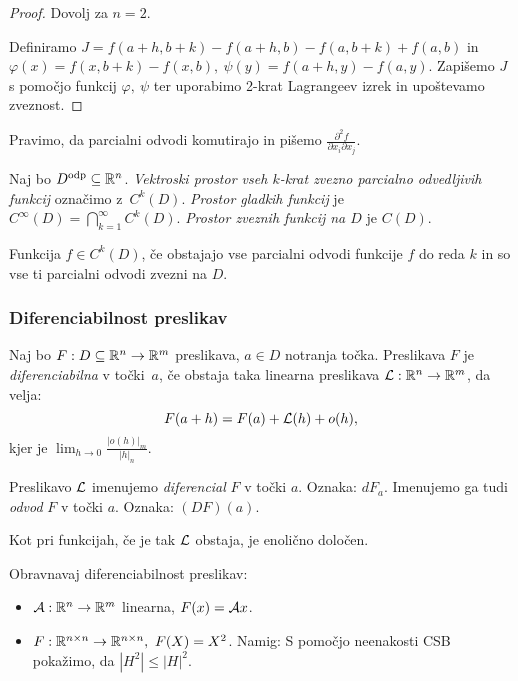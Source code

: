 \begin{proof}
    Dovolj za $n=2$. 
    
    Definiramo $J = f(a+h, b+k) - f(a+h, b) - f(a, b+k) + f(a,b)$ in $\varphi(x) = f(x, b+k) - f(x, b), \ \psi(y) = f(a+h, y) - f(a, y)$. Zapišemo $J$ s pomočjo funkcij $\varphi, \ \psi$ ter uporabimo 2-krat Lagrangeev izrek in upoštevamo zveznost.
\end{proof}

\begin{opomba}
     Pravimo, da parcialni odvodi komutirajo in pišemo $\frac{\partial^2 f}{\partial x_i \partial x_j}$.
\end{opomba}

\begin{definicija}
    Naj bo $D^\text{odp} \subseteq \mathbb{R}^n$. \emph{Vektroski prostor vseh $k$-krat zvezno parcialno odvedljivih funkcij} označimo z~$C^k(D)$. \emph{Prostor gladkih funkcij} je $C^\infty(D) = \bigcap_{k=1}^\infty C^k(D)$. \emph{Prostor zveznih funkcij na $D$} je $C(D)$.
\end{definicija}

\begin{opomba}
    Funkcija $f \in C^k(D)$, če obstajajo vse parcialni odvodi funkcije $f$ do reda $k$ in so vse ti parcialni odvodi zvezni na $D$. 
\end{opomba}

\subsubsection{Diferenciabilnost preslikav}

\begin{definicija}
    Naj bo $F: D \subseteq \mathbb{R}^n \to \mathbb{R}^m$ preslikava, $a \in D$ notranja točka. Preslikava $F$ je \emph{diferenciabilna} v točki~$a$, če obstaja taka linearna preslikava $\mathcal{L}: \mathbb{R}^n \to \mathbb{R}^m$, da velja:
    $$F(a+h) = F(a) + \mathcal{L}(h) + o(h),$$
    kjer je $\lim_{h \to 0} \frac{|o(h)|_m}{|h|_n}$. 

    Preslikavo $\mathcal{L}$ imenujemo \emph{diferencial} $F$ v točki $a$. Oznaka: $dF_a$. Imenujemo ga tudi \emph{odvod} $F$ v točki $a$. Oznaka: $(DF)(a)$.
\end{definicija}

\begin{opomba}
    Kot pri funkcijah, če je tak $\mathcal{L}$ obstaja, je enolično določen.
\end{opomba}

\begin{zgled}
    Obravnavaj diferenciabilnost preslikav:
    \begin{itemize}
        \item $\mathcal{A}: \mathbb{R}^n \to \mathbb{R}^m$ linearna, $F(x) = \mathcal{A}x$.
        \item $F: \mathbb{R}^{n \times n} \to \mathbb{R}^{n \times n}, \ F(X) = X^2$.         
        Namig: S pomočjo neenakosti CSB pokažimo, da $|H^2| \leq |H|^2$.
    \end{itemize}
\end{zgled}

